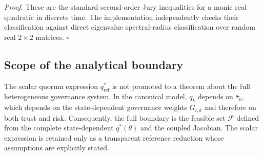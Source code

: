\textit{Proof.} These are the standard second-order Jury inequalities for a monic real quadratic in discrete time. The implementation independently checks their classification against direct eigenvalue spectral-radius classification over random real $2\times2$ matrices. \hfill$\square$

\subsection{Scope of the analytical boundary}
The scalar quorum expression $q^*_{\mathrm{ref}}$ is not promoted to a theorem about the full heterogeneous governance system. In the canonical model, $q_k$ depends on $\bar\tau_k$, which depends on the state-dependent governance weights $G_{i,k}$ and therefore on both trust and risk. Consequently, the full boundary is the feasible set $\mathcal F$ defined from the complete state-dependent $q^*(\theta)$ and the coupled Jacobian. The scalar expression is retained only as a transparent reference reduction whose assumptions are explicitly stated.
